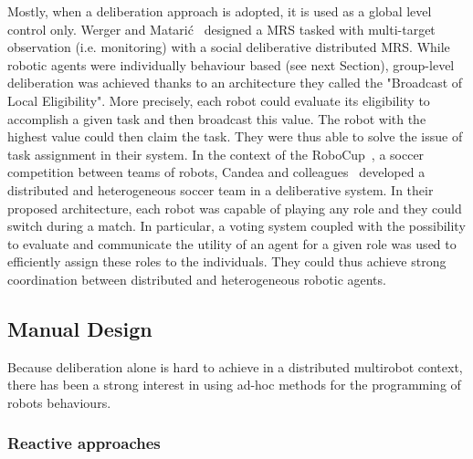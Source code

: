     Mostly, when a deliberation approach is adopted, it is used as a global level control only. Werger and Matarić~\parencite{Werger2000} designed a MRS tasked with multi-target observation (i.e. monitoring) with a social deliberative distributed MRS. While robotic agents were individually behaviour based (see next Section), group-level deliberation was achieved thanks to an architecture they called the "Broadcast of Local Eligibility". More precisely, each robot could evaluate its eligibility to accomplish a given task and then broadcast this value. The robot with the highest value could then claim the task. They were thus able to solve the issue of task assignment in their system. In the context of the RoboCup~\parencite{Kitano1997}, a soccer competition between teams of robots, Candea and colleagues~\parencite{Candea2001} developed a distributed and heterogeneous soccer team in a deliberative system. In their proposed architecture, each robot was capable of playing any role and they could switch during a match. In particular, a voting system coupled with the possibility to evaluate and communicate the utility of an agent for a given role was used to efficiently assign these roles to the individuals. They could thus achieve strong coordination between distributed and heterogeneous robotic agents.


  \subsection{Manual Design}

    Because deliberation alone is hard to achieve in a distributed multirobot context, there has been a strong interest in using ad-hoc methods for the programming of robots behaviours.

    \subsubsection{Reactive approaches}


